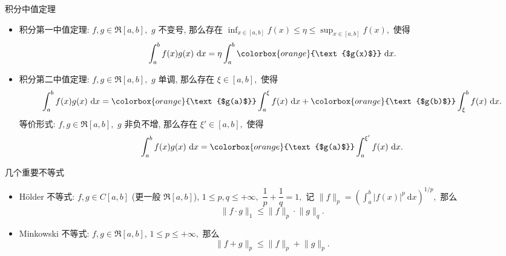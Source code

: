
\begin{frame}{积分中值定理}

\begin{itemize}
\item 积分第一中值定理: $f, g \in \mathfrak{R}[a, b],$ {\color{red}$g$ 不变号}, 那么存在 $\inf_{x \in [a,b]} f(x) \leqslant \eta \leqslant \sup_{x \in [a,b]} f(x),$ 使得
\[\int_a^b f(x) g(x) ~ \mathrm{d} x = \eta \int_a^b \colorbox{orange}{\text{$g(x)$}} ~ \mathrm{d} x.\]
\pause
\item 积分第二中值定理: $f, g \in \mathfrak{R}[a, b],$ {\color{red}$g$ 单调}, 那么存在 $\xi \in [a, b],$ 使得
\[\int_a^b f(x) g(x) ~ \mathrm{d} x = \colorbox{orange}{\text{$g(a)$}} \int_a^\xi f(x) ~ \mathrm{d} x + \colorbox{orange}{\text{$g(b)$}} \int_{\xi}^b f(x) ~ \mathrm{d} x.\]
\pause
等价形式: $f, g \in \mathfrak{R}[a, b],$ {\color{red}$g$ 非负不增}, 那么存在 $\xi' \in [a, b],$ 使得
\[\int_a^b f(x) g(x) ~ \mathrm{d} x = \colorbox{orange}{\text{$g(a)$}} \int_a^{\xi'} f(x) ~ \mathrm{d} x.\]
\end{itemize}

\end{frame}


\begin{frame}{几个重要不等式}

\begin{itemize}[<+->]
\item H\"older 不等式: $f, g \in C[a, b]$ (更一般 $\mathfrak{R}[a, b]$), $1 \leqslant p, q \leqslant +\infty,$ $\dfrac{1}{p} + \dfrac{1}{q} = 1,$ 记 $\lVert f \rVert_p = \left( \int_a^b \lvert f(x) \rvert^p ~ \mathrm{d} x \right)^{1/p},$ 那么
\[\lVert f \cdot g \rVert_1 \leqslant \lVert f \rVert_p \cdot \lVert g \rVert_q.\]
\item Minkowski 不等式: $f, g \in \mathfrak{R}[a, b]$, $1 \leqslant p \leqslant +\infty,$ 那么
\[\lVert f + g \rVert_p \leqslant \lVert f \rVert_p + \lVert g \rVert_p.\]
\end{itemize}

\end{frame}


